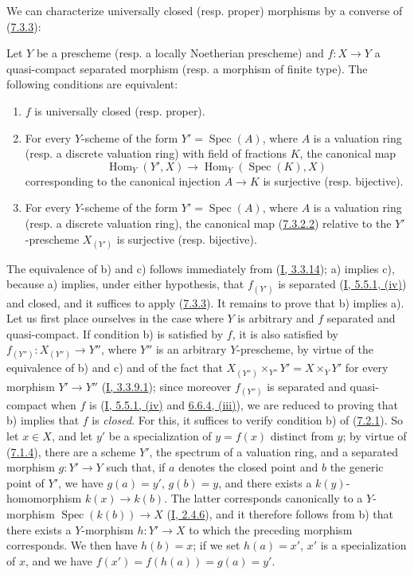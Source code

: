 We can characterize universally closed (resp. proper) morphisms
by a converse of (\hyperref[II.7.3.3]{7.3.3}):

\begin{theorem}[7.3.8]
\label{II.7.3.8}
Let $Y$ be a prescheme (resp. a locally Noetherian prescheme) and $f:X\to Y$
a quasi-compact separated morphism (resp. a morphism of finite type). The
following conditions are equivalent:
\begin{enumerate}
\item[\rm a)] $f$ is universally closed (resp. proper).
\item[\rm b)] For every $Y$-scheme of the form
$Y'=\operatorname{Spec}(A)$, where $A$ is a valuation ring (resp. a discrete
valuation ring) with field of fractions $K$, the canonical map
\[
\operatorname{Hom}_Y(Y',X)\longrightarrow
\operatorname{Hom}_Y(\operatorname{Spec}(K),X)
\]
corresponding to the canonical injection $A\to K$ is surjective (resp.
bijective).
\item[\rm c)] For every $Y$-scheme of the form $Y'=\operatorname{Spec}(A)$,
where $A$ is a valuation ring (resp. a discrete valuation ring),
the canonical map (\hyperref[II.7.3.2.2]{7.3.2.2}) relative to the
$Y'$-prescheme $X_{(Y')}$ is surjective (resp. bijective).
\end{enumerate}
\end{theorem}

The equivalence of b) and c) follows immediately from
(\hyperref[I.3.3.14]{I, 3.3.14}); a) implies c), because a) implies, under
either hypothesis, that $f_{(Y')}$ is separated
(\hyperref[I.5.5.1]{I, 5.5.1, (iv)}) and closed, and it suffices to apply
(\hyperref[II.7.3.3]{7.3.3}). It remains to prove that b) implies a).
Let us first place ourselves in the case where $Y$ is arbitrary and $f$
separated and quasi-compact. If condition b) is satisfied by $f$, it is also
satisfied by $f_{(Y'')}:X_{(Y'')}\to Y''$, where $Y''$ is an arbitrary
$Y$-prescheme, by virtue of the equivalence of b) and c) and of the fact that
$X_{(Y'')}\times_{Y''}Y'=X\times_YY'$ for every morphism $Y'\to Y''$
(\hyperref[I.3.3.9.1]{I, 3.3.9.1}); since moreover $f_{(Y'')}$ is
separated and quasi-compact when $f$ is
(\hyperref[I.5.5.1]{I, 5.5.1, (iv)} and
\hyperref[I.6.6.4]{6.6.4, (iii)}), we are reduced to proving that b) implies
that $f$ is \emph{closed}. For this, it suffices to verify condition b) of
(\hyperref[II.7.2.1]{7.2.1}). So let $x\in X$, and let $y'$ be a
specialization of $y=f(x)$ distinct from $y$; by virtue of
(\hyperref[II.7.1.4]{7.1.4}), there are a scheme $Y'$, the spectrum of a
valuation ring, and a separated morphism $g:Y'\to Y$ such that, if $a$
denotes the closed point and $b$ the generic point of $Y'$, we have
$g(a)=y'$, $g(b)=y$, and there exists a $k(y)$-homomorphism
$k(x)\to k(b)$. The latter corresponds canonically to a $Y$-morphism
$\operatorname{Spec}(k(b))\to X$
(\hyperref[I.2.4.6]{I, 2.4.6}), and it therefore follows from b) that there
exists a $Y$-morphism $h:Y'\to X$ to which the preceding morphism
corresponds. We then have $h(b)=x$; if we set $h(a)=x'$, $x'$ is a
specialization of $x$, and we have $f(x')=f(h(a))=g(a)=y'$.

